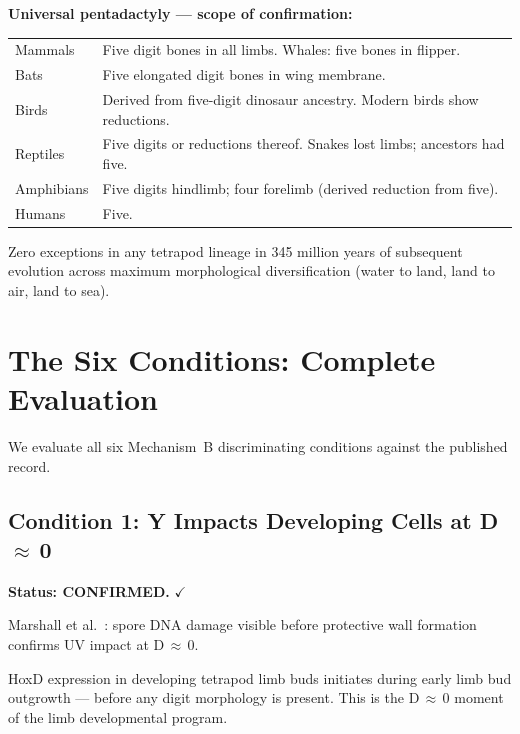 \documentclass[11pt, a4paper]{article}
\begin{document}
\begin{mdframed}[
  linecolor=confirmgreen,
  linewidth=1pt,
  innertopmargin=0.5em,
  innerbottommargin=0.5em,
  innerleftmargin=1em,
  innerrightmargin=1em
]
\textbf{Universal pentadactyly --- scope of
confirmation:}

\smallskip
\begin{tabular}{p{3cm}p{8cm}}
Mammals & Five digit bones in all limbs.
  Whales: five bones in flipper. \\[0.2em]
Bats & Five elongated digit bones in wing
  membrane. \\[0.2em]
Birds & Derived from five-digit dinosaur
  ancestry. Modern birds show reductions. \\[0.2em]
Reptiles & Five digits or reductions thereof.
  Snakes lost limbs; ancestors had five. \\[0.2em]
Amphibians & Five digits hindlimb; four forelimb
  (derived reduction from five). \\[0.2em]
Humans & Five. \\
\end{tabular}

\medskip
Zero exceptions in any tetrapod lineage in
345 million years of subsequent evolution
across maximum morphological diversification
(water to land, land to air, land to sea).
\end{mdframed}

\section{The Six Conditions: Complete Evaluation}

We evaluate all six Mechanism~B discriminating
conditions against the published record.

\subsection{Condition 1: Y Impacts Developing
Cells at D\,$\approx$\,0}

\textbf{Status: CONFIRMED.} \textcolor{confirmgreen}{$\checkmark$}

Marshall et al.\ \cite{marshall2020}:
spore DNA damage visible before protective
wall formation confirms UV impact at D\,$\approx$\,0.

HoxD expression in developing tetrapod limb buds
initiates during early limb bud outgrowth ---
before any digit morphology is present.
This is the D\,$\approx$\,0 moment of the limb
developmental program.
\end{document}
